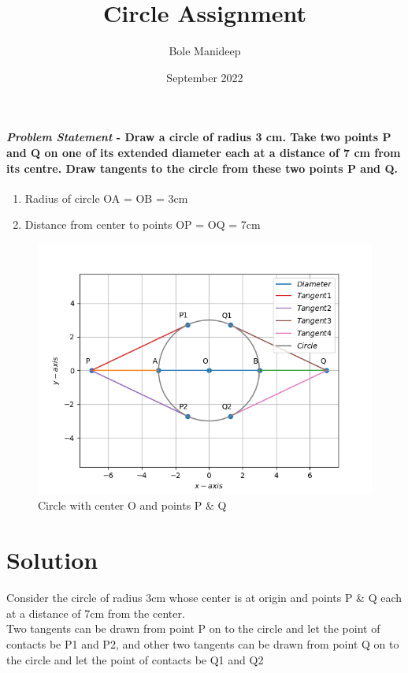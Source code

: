 \documentclass[journal,10pt,twocolumn]{article}
\title{\textbf{Circle Assignment}}
\author{Bole Manideep}
\date{September 2022}
\begin{document}
\maketitle
\paragraph{\large{\textit{Problem Statement} - Draw a circle of radius 3 cm. Take two points P and Q on one of its extended diameter each at a distance of 7 cm from its centre. Draw tangents to the circle from these two points P and Q.}}
\begin{enumerate}
	\item \large Radius of circle OA = OB = 3cm
	\item \large Distance from center to points OP = OQ = 7cm
\end{enumerate}

\begin{figure}[h]
\centering
\includegraphics[width=1\columnwidth]{Question.png}
\caption{Circle with center O and points P \& Q}
\label{fig:Circle}
\end{figure}

\section*{Solution}

\raggedright \large{Consider the circle of radius 3cm whose center is at origin and points P \& Q each at a distance of 7cm from the center. \\
Two tangents can be drawn from point P on to the circle and let the point of contacts be P1 and P2, and other two tangents can be drawn from point Q on to the circle and let the point of contacts be Q1 and Q2} \\ \vspace{2mm}
\end{document}
